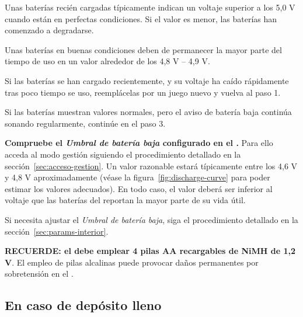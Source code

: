 \begin{enumeratecompact}
\begin{itemizecompact}
\item Unas baterías recién cargadas típicamente indican un voltaje superior a los 5,0 V cuando están en perfectas condiciones. Si el valor es menor, las baterías han comenzado a degradarse.

\item Unas baterías en buenas condiciones deben de permanecer la mayor parte del tiempo de uso en un valor alrededor de los 4,8 V -- 4,9 V.

\item Si las baterías se han cargado recientemente, y su voltaje ha caído rápidamente tras poco tiempo se uso, reemplácelas por un juego nuevo y vuelva al paso 1.

\item Si las baterías muestran valores normales, pero el aviso de batería baja continúa sonando regularmente, continúe en el paso 3.

\end{itemizecompact}

\item \textbf{Compruebe el \emph{Umbral de batería baja} configurado en el \MIE.} Para ello acceda al modo gestión siguiendo el procedimiento detallado en la sección~\ref{sec:acceso-gestion}. Un valor razonable estará típicamente entre los 4,6 V y 4,8 V aproximadamente (véase la figura~\ref{fig:discharge-curve} para poder estimar los valores adecuados). En todo caso, el valor deberá ser inferior al voltaje que las baterías del \ME reportan la mayor parte de su vida útil.

\begin{itemizecompact}

\item Si necesita ajustar el \emph{Umbral de batería baja}, siga el procedimiento detallado en la sección~\ref{sec:params-interior}.

\end{itemizecompact}

\end{enumeratecompact}



\textbf{RECUERDE: el \MEE debe emplear 4 pilas AA recargables de NiMH de 1,2 V}. El empleo de pilas alcalinas puede provocar daños permanentes por sobretensión en el \ME. 
\importantend


\subsection{En caso de depósito lleno}
\label{sec:deposito-lleno}

